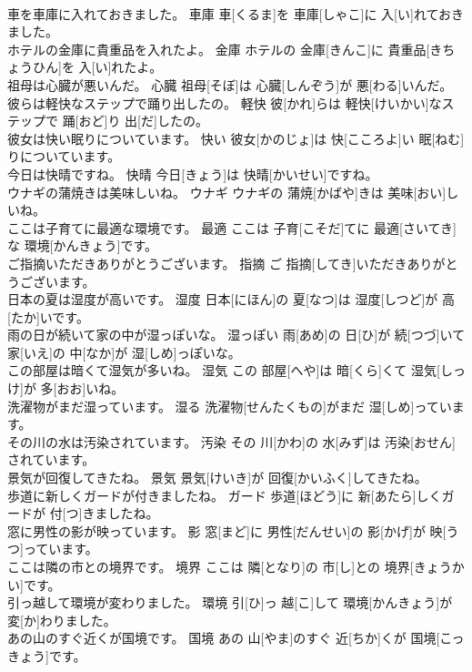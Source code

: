 \documentclass[8pt]{extreport}
\begin{document}
\begin{CJK}{UTF8}{min}
\\	車を車庫に入れておきました。	車庫	車[くるま]を 車庫[しゃこ]に 入[い]れておきました。	
\\	ホテルの金庫に貴重品を入れたよ。	金庫	ホテルの 金庫[きんこ]に 貴重品[きちょうひん]を 入[い]れたよ。	
\\	祖母は心臓が悪いんだ。	心臓	祖母[そぼ]は 心臓[しんぞう]が 悪[わる]いんだ。	
\\	彼らは軽快なステップで踊り出したの。	軽快	彼[かれ]らは 軽快[けいかい]なステップで 踊[おど]り 出[だ]したの。	
\\	彼女は快い眠りについています。	快い	彼女[かのじょ]は 快[こころよ]い 眠[ねむ]りについています。	
\\	今日は快晴ですね。	快晴	今日[きょう]は 快晴[かいせい]ですね。	
\\	ウナギの蒲焼きは美味しいね。	ウナギ	ウナギの 蒲焼[かばや]きは 美味[おい]しいね。	
\\	ここは子育てに最適な環境です。	最適	ここは 子育[こそだ]てに 最適[さいてき]な 環境[かんきょう]です。	
\\	ご指摘いただきありがとうございます。	指摘	ご 指摘[してき]いただきありがとうございます。	
\\	日本の夏は湿度が高いです。	湿度	日本[にほん]の 夏[なつ]は 湿度[しつど]が 高[たか]いです。	
\\	雨の日が続いて家の中が湿っぽいな。	湿っぽい	雨[あめ]の 日[ひ]が 続[つづ]いて 家[いえ]の 中[なか]が 湿[しめ]っぽいな。	
\\	この部屋は暗くて湿気が多いね。	湿気	この 部屋[へや]は 暗[くら]くて 湿気[しっけ]が 多[おお]いね。	
\\	洗濯物がまだ湿っています。	湿る	洗濯物[せんたくもの]がまだ 湿[しめ]っています。	
\\	その川の水は汚染されています。	汚染	その 川[かわ]の 水[みず]は 汚染[おせん]されています。	
\\	景気が回復してきたね。	景気	景気[けいき]が 回復[かいふく]してきたね。	
\\	歩道に新しくガードが付きましたね。	ガード	歩道[ほどう]に 新[あたら]しくガードが 付[つ]きましたね。	
\\	窓に男性の影が映っています。	影	窓[まど]に 男性[だんせい]の 影[かげ]が 映[うつ]っています。	
\\	ここは隣の市との境界です。	境界	ここは 隣[となり]の 市[し]との 境界[きょうかい]です。	
\\	引っ越して環境が変わりました。	環境	引[ひ]っ 越[こ]して 環境[かんきょう]が 変[か]わりました。	
\\	あの山のすぐ近くが国境です。	国境	あの 山[やま]のすぐ 近[ちか]くが 国境[こっきょう]です。	

\end{CJK}
\end{document}
